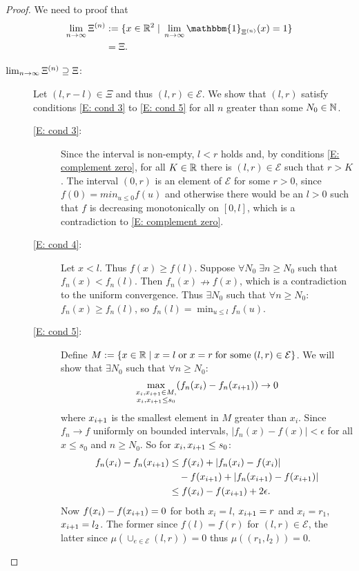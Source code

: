 \begin{proof}
We need to proof that
\begin{equation}
\begin{aligned}
\lim_{n \rightarrow \infty} \Xin 
&:= \lbrace x \in \Real^2 \; | \; \lim_{n \rightarrow \infty} \mathbbm{1}_{\Xin}(x) = 1 \rbrace \\ 
&= \Xi.
\end{aligned}
\end{equation}
\begin{description} %
\item[$\lim_{n \rightarrow \infty} \Xi^{(n)} \supseteq \Xi$:] 
Let $(l, r-l) \in \Xi$ and thus $(l, r) \in \mathcal{E}$.
We show that $(l,r)$ satisfy conditions \eqref{E: cond 3} to \eqref{E: cond 5} for all $n$ greater than some $N_0 \in \mathbb{N}$.

\begin{description} %
	\item[\eqref{E: cond 3}:] 
Since the interval is non-empty, $l < r$ holds
and, by conditions \eqref{E: complement zero},
for all $K \in \mathbb{R}$ there is $(l,r) \in \mathcal{E}$ such that $r > K$.
The interval $(0,r)$ is an element of $\mathcal{E}$ for some $r>0$, 
since $f(0) = min_{u \leq 0}f(u)$
and otherwise there would be an $l>0$ such that $f$ is decreasing monotonically on $[0,l]$,
which is a contradiction to \eqref{E: complement zero}.
	\item[\eqref{E: cond 4}:]
Let $x < l$. Thus $f(x) \geq f(l)$. 
Suppose $\forall N_0 \; \exists n \geq N_0$ such that
$f_n(x) < f_n(l)$.
Then $f_n(x) \nrightarrow f(x)$, 
which is a contradiction to the uniform convergence.
Thus $\exists N_0$ such that $\forall n \geq N_0$: 
$f_n(x) \geq f_n(l)$, so
$f_n(l) = \min_{u \leq l}f_n(u)$.
	\item[\eqref{E: cond 5}:]
Define $M:=\lbrace x \in \mathbb{R} \; | \; x=l \; \text{or} \; x=r \; \text{for some} \; (l,r) \in \mathcal{E} \rbrace$.
We will show that $\exists N_0$ such that $\forall n \geq N_0$:
\begin{equation*}
\max_{\substack{x_i, x_{i+1} \in M, \\ x_i, x_{i+1} \leq s_0}} (f_n(x_i) - f_n(x_{i+1})) \rightarrow 0
\end{equation*}
where $x_{i+1}$ is the smallest element in $M$ greater than $x_i$.
Since $f_n \rightarrow f$ uniformly on bounded intervals, 
$|f_n(x) - f(x)| < \epsilon$ for all $x \leq s_0$ and $n \geq N_0$.
So for $x_i, x_{i+1} \leq s_0$:
\begin{equation}
\begin{aligned}
f_n(x_i) - f_n(x_{i+1}) 
&\leq f(x_i) + |f_n(x_i) - f(x_i)| \\
&\quad - f(x_{i+1}) + |f_n(x_{i+1}) -f(x_{i+1})| \\
&\leq f(x_i) - f(x_{i+1}) + 2\epsilon.
\end{aligned} 
\end{equation}
Now $f(x_i) - f(x_{i+1}) = 0$ for both $x_i = l$, $x_{i+1} = r$ 
and $x_i = r_1$, $x_{i+1} = l_2$. 
The former since $f(l) = f(r)$ for $(l,r) \in \mathcal{E}$,
the latter since $\mu \left(\cup_{e \in \mathcal{E}} (l,r)\right) = 0$
thus $\mu \left( (r_1, l_2) \right) = 0$.


\end{description}
\end{description}
\end{proof}
